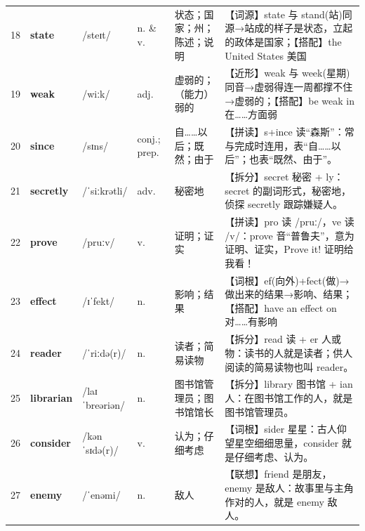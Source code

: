 \documentclass[UTF8,a4paper,11pt,oneside]{ctexbook}
\newcommand{\cellword}[1]{{\bfseries\textcolor{wordcol}{#1}}}
\newcommand{\cellipa}[1]{{\footnotesize\textcolor{ipacol}{#1}}}
\newcommand{\cellpos}[1]{\textcolor{poscol}{#1}}
\newcommand{\cellno}[1]{\textcolor{volcolor!75!black}{#1}}
\begin{document}
{\begin{longtable}{@{}C{0.045\textwidth}L{0.155\textwidth}L{0.175\textwidth}C{0.070\textwidth}L{0.180\textwidth}L{0.282\textwidth}@{}}
\cellno{18} & \cellword{state} & \cellipa{/steɪt/} & \cellpos{n.  \& v.} & 状态；国家；州；陈述；说明 & \textcolor{tagEtym}{【词源】}state 与 stand(站)同源→\allowbreak{}站成的样子是状态，立起的政体是国家；\textcolor{tagColloc}{【搭配】}the United States 美国 \\
 \cellno{19} & \cellword{weak} & \cellipa{/wiːk/} & \cellpos{adj.} & 虚弱的；（能力）弱的 & \textcolor{tagNear}{【近形】}weak 与 week(星期)同音→\allowbreak{}虚弱得连一周都撑不住→\allowbreak{}虚弱的；\textcolor{tagColloc}{【搭配】}be weak in 在……方面弱 \\
\cellno{20} & \cellword{since} & \cellipa{/sɪns/} & \cellpos{conj.;\allowbreak{} prep.} & 自……以后；既然；由于 & \textcolor{tagSpell}{【拼读】}s+ince 读“森斯”：常与完成时连用，表“自……以后”；也表“既然、由于”。 \\
 \cellno{21} & \cellword{secretly} & \cellipa{/ˈsiːkrətli/} & \cellpos{adv.} & 秘密地 & \textcolor{tagSplit}{【拆分】}secret 秘密 + ly：secret 的副词形式，秘密地，侦探 secretly 跟踪嫌疑人。 \\
\cellno{22} & \cellword{prove} & \cellipa{/pruːv/} & \cellpos{v.} & 证明；证实 & \textcolor{tagSpell}{【拼读】}pro 读 /pruː/，ve 读 /v/：prove 音“普鲁夫”，意为证明、证实，Prove it! 证明给我看！ \\
 \cellno{23} & \cellword{effect} & \cellipa{/ɪˈfekt/} & \cellpos{n.} & 影响；结果 & \textcolor{tagRoot}{【词根】}ef(向外)+fect(做)→\allowbreak{}做出来的结果→\allowbreak{}影响、结果；\textcolor{tagColloc}{【搭配】}have an effect on 对……有影响 \\
\cellno{24} & \cellword{reader} & \cellipa{/ˈriːdə(r)/} & \cellpos{n.} & 读者；简易读物 & \textcolor{tagSplit}{【拆分】}read 读 + er 人或物：读书的人就是读者；供人阅读的简易读物也叫 reader。 \\
 \cellno{25} & \cellword{librarian} & \cellipa{/laɪˈbreəriən/} & \cellpos{n.} & 图书馆管理员；图书馆馆长 & \textcolor{tagSplit}{【拆分】}library 图书馆 + ian 人：在图书馆工作的人，就是图书馆管理员。 \\
\cellno{26} & \cellword{consider} & \cellipa{/kənˈsɪdə(r)/} & \cellpos{v.} & 认为；仔细考虑 & \textcolor{tagRoot}{【词根】}sider 星星：古人仰望星空细细思量，consider 就是仔细考虑、认为。 \\
 \cellno{27} & \cellword{enemy} & \cellipa{/ˈenəmi/} & \cellpos{n.} & 敌人 & \textcolor{tagAssoc}{【联想】}friend 是朋友，enemy 是敌人：故事里与主角作对的人，就是 enemy 敌人。 \\

\end{longtable}}
\end{document}
